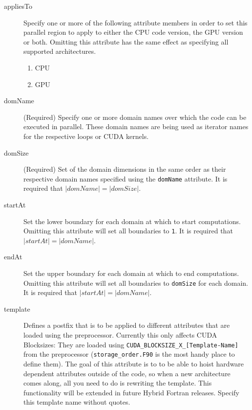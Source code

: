\begin{description}
 \item [appliesTo] Specify one or more of the following attribute members in order to set this parallel region to apply to either the CPU code version, the GPU version or both. Omitting this attribute has the same effect as specifying all supported architectures.
  \begin{enumerate}
   \item CPU
   \item GPU
  \end{enumerate}
 \item [domName] (Required) Specify one or more domain names over which the code can be executed in parallel. These domain names are being used as iterator names for the respective loops or CUDA kernels.
 \item [domSize] (Required) Set of the domain dimensions in the same order as their respective domain names specified using the \verb|domName| attribute. It is required that $|domName| = |domSize|$.
 \item [startAt] Set the lower boundary for each domain at which to start computations. Omitting this attribute will set all boundaries to \verb|1|. It is required that $|startAt| = |domName|$.
 \item [endAt] Set the upper boundary for each domain at which to end computations. Omitting this attribute will set all boundaries to \verb|domSize| for each domain. It is required that $|startAt| = |domName|$.
 \item [template] Defines a postfix that is to be applied to different attributes that are loaded using the preprocessor. Currently this only affects CUDA Blocksizes: They are loaded using \verb|CUDA_BLOCKSIZE_X_[Template-Name]| from the preprocessor (\verb|storage_order.F90| is the most handy place to define them). The goal of this attribute is to to be able to hoist hardware dependent attributes outside of the code, so when a new architecture comes along, all you need to do is rewriting the template. This functionality will be extended in future Hybrid Fortran releases. Specify this template name without quotes.
\end{description}

